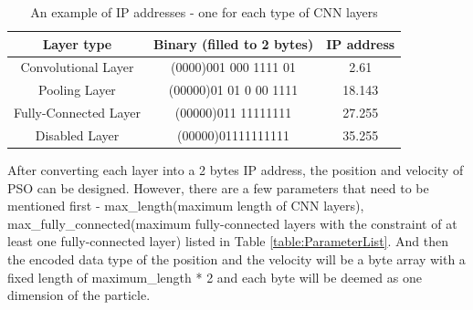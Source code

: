 \documentclass[conference]{IEEEtran}
\begin{document}
\begin{table}[!t]
	\renewcommand{\arraystretch}{1.3}
	\caption{An example of IP addresses - one for each type of CNN layers}
	\label{table:IPExample}
	\centering
	\begin{tabular}{|c|c|c|}
		\hline
		Layer type & Binary (filled to 2 bytes) & IP address\\
		\hline
		Convolutional Layer & (0000)001 000 1111 01 & 2.61\\
		\hline
		Pooling Layer & (00000)01 01 0 00 1111 & 18.143\\
		\hline
		Fully-Connected Layer & (00000)011 11111111 & 27.255\\
		\hline
		Disabled Layer & (00000)01111111111 & 35.255\\
		\hline
	\end{tabular}
\end{table}

After converting each layer into a 2 bytes IP address, the position and velocity of PSO can be designed. However, there are a few parameters that need to be mentioned first - max\_length(maximum length of CNN layers), max\_fully\_connected(maximum fully-connected layers with the constraint of at least one fully-connected layer) listed in Table \ref{table:ParameterList}. And then the encoded data type of the position and the velocity will be a byte array with a fixed length of maximum\_length * 2 and each byte will be deemed as one dimension of the particle.
\end{document}
